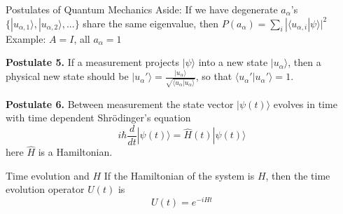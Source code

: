 \documentclass[UTF8,12pt]{article} %
\begin{document}
\begin{myboxes}{Postulates of Quantum Mechanics}{}
Aside: If we have degenerate $a_{\alpha}$'s $\{|u_{\alpha,1}\rangle, |u_{\alpha,2}\rangle, ...\}$ share the same eigenvalue, then $P(a_{\alpha}) = \sum_{i} |\langle u_{\alpha,i}|\psi\rangle|^{2}$\\
Example: $A = I$, all $a_{\alpha} = 1$\\\par
\textbf{Postulate 5.} If a measurement projects $|\psi\rangle$ into a new state $|u_{\alpha}\rangle$, then a physical new state should be $|u_{\alpha}'\rangle = \frac{|u_{\alpha}\rangle}{\sqrt{\langle u_{\alpha}|u_{\alpha}\rangle}}$, so that $\langle u_{\alpha}'|u_{\alpha}'\rangle = 1$.\\\par
\textbf{Postulate 6.} Between measurement the state vector $|\psi(t)\rangle$ evolves in time with time dependent Shr\"{o}dinger's equation $$i\hbar \frac{d}{dt}|\psi(t)\rangle = \hat{H}(t)|\psi(t)\rangle$$ here $\hat{H}$ is a Hamiltonian.
\end{myboxes}

\begin{myboxes}{Time evolution and $H$}{}
If the Hamiltonian of the system is $H$, then the time evolution operator $U(t)$ is 
$$U(t) = e^{-iHt}$$
\end{myboxes}

\section{}
\end{document}
